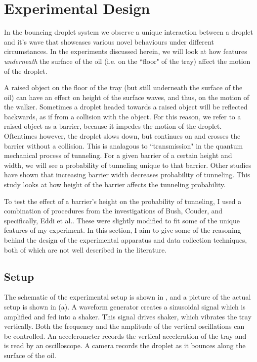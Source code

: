 \chapter{Experimental Design}
\label{Ch2}

In the bouncing droplet system we observe a unique interaction between a droplet and it's wave that showcases various novel behaviours under different circumstances.  In the experiments discussed herein, we will look at how features \textit{underneath} the surface of the oil (i.e. on the ``floor" of the tray) affect the motion of the droplet. 

A raised object on the floor of the tray (but still underneath the surface of the oil) can have an effect on height of the surface waves, and thus, on the motion of the walker. Sometimes a droplet headed towards a raised object will be reflected backwards, as if from a collision with the object. For this reason, we refer to a raised object as a barrier, because it impedes the motion of the droplet. Oftentimes however, the droplet slows down, but continues on and crosses the barrier without a collision. This is analagous to ``transmission" in the quantum mechanical process of tunneling. For a given barrier of a certain height and width, we will see a probability of tunneling unique to that barrier. Other studies have shown that increasing barrier width decreases probability of tunneling. This study looks at how height of the barrier affects the tunneling probability. 

To test the effect of a barrier's height on the probability of tunneling, I used a combination of procedures from the investigations of Bush, Couder, and specifically, Eddi et al.. These were slightly modified to fit some of the unique features of my experiment. In this section, I aim to give some of the reasoning behind the  design of the experimental apparatus and data collection techniques, both of which are not well described in the literature.

\section{Setup}
    The schematic of the experimental setup is shown in , and a picture of the actual setup is shown in (a). A waveform generator creates a sinusoidal signal which is amplified and fed into a shaker. This signal drives shaker, which vibrates the tray vertically. Both the frequency and the amplitude of the vertical oscillations can be controlled. An accelerometer records the vertical acceleration of the tray and is read by an oscilloscope. A camera records the droplet as it bounces along the surface of the oil.  
    
